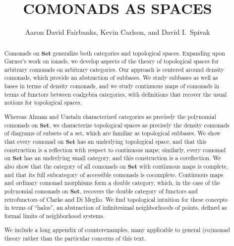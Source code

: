 \documentclass[11pt, oneside, article]{memoir}
\theoremstyle{plain}
\theoremstyle{definition}
\theoremstyle{remark}
\newcommand{\namedcat}[1]{\mathbf{#1}}
\newcommand{\Set}{\namedcat{Set}}
\begin{document}
\title{COMONADS AS SPACES}
\author{Aaron David Fairbanks, Kevin Carlson, and David I.\ Spivak}
\date{}

\maketitle

\vspace{-3.5em}
\begin{abstract}
  Comonads on $\Set$ generalize both categories and topological
  spaces. Expanding upon Garner's work on ionads, we develop aspects
  of the theory of topological spaces for arbitrary comonads on
  arbitrary categories. Our approach is centered around density
  comonads, which provide an abstraction of subbases. We study
  subbases as well as bases in terms of density comonads, and we study
  continuous maps of comonads in terms of functors between coalgebra
  categories, with definitions that recover the usual notions for
  topological spaces.

  Whereas Ahman and Uustalu characterized categories as precisely the
  polynomial comonads on $\Set$, we characterize topological spaces as
  precisely the density comonads of diagrams of subsets of a set,
  which are familiar as topological subbases. We show that every
  comonad on $\Set$ has an underlying topological space, and that this
  construction is a reflection with respect to continuous maps;
  similarly, every comonad on $\Set$ has an underlying small category,
  and this construction is a coreflection. We also show that the
  category of all comonads on $\Set$ with continuous maps is complete,
  and that its full subcategory of accessible comonads is cocomplete.
  Continuous maps and ordinary comonad morphisms form a double
  category, which, in the case of the polynomial comonads on $\Set$,
  recovers the double category of functors and retrofunctors of Clarke
  and Di Meglio. We find topological intuition for these concepts in
  terms of ``halos'', an abstraction of infinitesimal neighborhoods of
  points, defined as formal limits of neighborhood systems.

  We include a long appendix of counterexamples, many applicable to
  general (co)monad theory rather than the particular concerns of this
  text.
\end{abstract}

\clearpage

\hypertarget{toc}{}
\tableofcontents*

\clearpage
\end{document}
